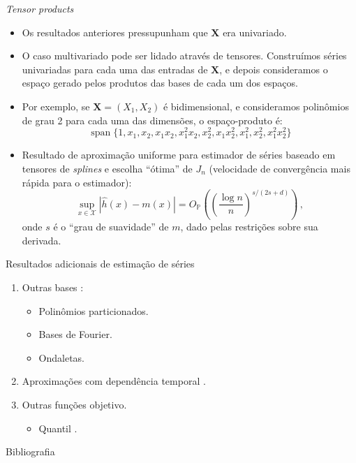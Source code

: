 \documentclass[11pt]{beamer}
\begin{document}
	\begin{frame}{\textit{Tensor products}}
		\begin{itemize}
			\item Os resultados anteriores pressupunham que $\boldsymbol{X}$ era univariado.
			\item O caso multivariado pode ser lidado através de tensores. Construímos séries univariadas para cada uma das entradas de $\boldsymbol{X}$, e depois consideramos o espaço gerado pelos produtos das bases de cada um dos espaços.
			\item Por exemplo, se $\boldsymbol{X} = (X_1,X_2)$ é bidimensional, e consideramos polinômios de grau 2 para cada uma das dimensões, o espaço-produto é:
			$$\operatorname{span}\{1, x_1,x_2, x_1 x_2, x_1^2 x_2, x_2^2, x_1 x_2^2, x_1^2, x_2^2, x_1^2 x_2^2\}$$
			\item Resultado de aproximação uniforme para estimador de séries baseado em tensores de \textit{splines} \citep{belloni2015some} e escolha ``ótima'' de $J_n$ (velocidade de convergência mais rápida para o estimador):
			$$\sup _{x \in \mathcal{X}}|\widehat{h}(x)-m(x)| = O_{\mathbb{P}}\left(\left(\frac{\log n}{n}\right)^{s /(2 s+d)}\right)\, ,$$
			onde $s$ é o ``grau de suavidade'' de $m$, dado pelas restrições sobre sua derivada.
		\end{itemize}	\end{frame}
	\begin{frame}{Resultados adicionais de estimação de séries}
\begin{enumerate}
	\item Outras bases \citep[veja][]{chen2007,belloni2015some,cattaneo2020large}:
	\begin{itemize}
		\item Polinômios particionados.
		\item Bases de Fourier.
		\item Ondaletas.
	\end{itemize}
	\item Aproximações com dependência temporal \citep{Chen2015}.
	\item Outras funções objetivo.
	\begin{itemize}
		\item Quantil  \citep{belloni2019conditional}.
	\end{itemize}
\end{enumerate}
	\end{frame}
	\appendix
		\begin{frame}[allowframebreaks]{Bibliografia}
	\printbibliography

	\end{frame}
\end{document}

